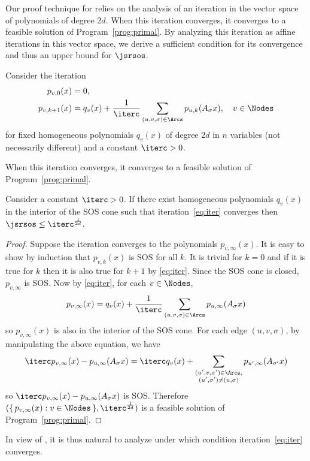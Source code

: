 \documentclass[11pt,twoside,a4paper,openright]{uclouvain-thesis}
\begin{document}
Our proof technique for  relies on the analysis of an iteration in the vector space of polynomials of degree $2d$.
When this iteration converges, it converges to a feasible solution of Program~\ref{prog:primal}.
By analyzing this iteration as affine iterations in this vector space, we derive a sufficient condition for its convergence
and thus an upper bound for $\jsrsos$.

Consider the iteration
\begin{align}
  \notag
  p_{v,0}(x) & = 0,\\
  \label{eq:iter}
  p_{v,k+1}(x) & = q_v(x) + \frac{1}{\iterc} %
  \sum_{(u,v,\sigma) \in \Arcs} p_{u,k}(A_\sigma x), \quad  v \in \Nodes
\end{align}
for fixed homogeneous polynomials $q_v(x)$ of degree $2d$ in $n$ variables (not necessarily different)
and a constant $\iterc > 0$.

When this iteration converges, it converges to a feasible solution of Program~\ref{prog:primal}.
\begin{mylem}
  \label{lem:conv}
  Consider a constant $\iterc > 0$.
  If there exist homogeneous polynomials $q_v(x)$ in the interior of the SOS cone such that
  iteration~\eqref{eq:iter} converges then
  \(
    \jsrsos \leq \iterc^{\frac{1}{2d}}.
  \)
  \begin{proof}
    Suppose the iteration converges to the polynomials $p_{v,\infty}(x)$.
    It is easy to show by induction that $p_{v,k}(x)$ is SOS for all $k$.
    It is trivial for $k = 0$ and if it is true for $k$ then it is also true for $k+1$ by \eqref{eq:iter}.
    Since the SOS cone is closed, $p_{v,\infty}$ is SOS.
    Now by \eqref{eq:iter}, for each $v \in \Nodes$,
    \[ p_{v,\infty}(x) = q_v(x) + \frac{1}{\iterc} %
    \sum_{(u,v,\sigma) \in \Arcs} p_{u,\infty}(A_\sigma x) \]
    so $p_{v,\infty}(x)$ is also in the interior of the SOS cone.
    For each edge $(u,v,\sigma)$, by manipulating the above equation, we have
    \[ \iterc p_{v,\infty}(x) - p_{u,\infty}(A_\sigma x) = \iterc q_v(x) + %
    \sum_{\substack{(u',v,\sigma') \in \Arcs,\\(u', \sigma') \neq (u, \sigma)}} p_{u',\infty}(A_{\sigma'} x) \]
    so $\iterc p_{v,\infty}(x) - p_{u,\infty}(A_\sigma x)$ is SOS.
    Therefore $(\{\, p_{v,\infty}(x) : v \in \Nodes \,\}, \iterc^{\frac{1}{2d}})$ is a feasible solution of Program~\ref{prog:primal}.
  \end{proof}
\end{mylem}

In view of , it is thus natural to analyze
under which condition iteration~\eqref{eq:iter} converges.
\end{document}
